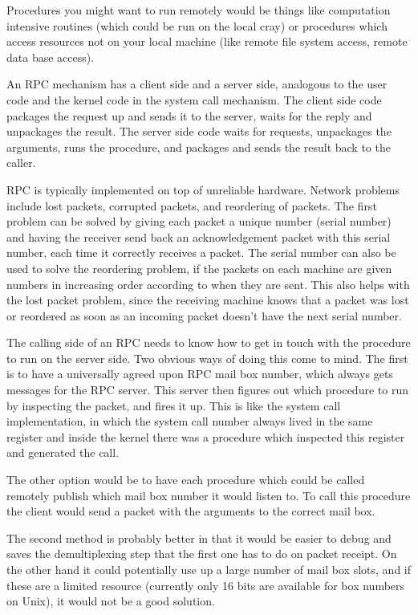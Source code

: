 Procedures you might want to run remotely would be things like computation
intensive routines (which could be run on the local cray) or
procedures which access resources not on your local machine (like remote
file system access, remote data base access).

An RPC mechanism has a client side and a server side, analogous
to the user code and the kernel code in the system call mechanism.
The client side code packages the request up and sends it to the server,
waits for the reply and unpackages the result.  The server side
code waits for requests, unpackages the arguments, runs the procedure,
and packages and sends the result back to the caller.

RPC is typically implemented on top of unreliable hardware.  Network problems
include lost packets, corrupted packets, and reordering of packets.  The
first problem can be solved by giving each packet a unique number (serial
number) and having the receiver send back an acknowledgement packet with
this serial number, each time it correctly receives a packet.  The serial
number can also be used to solve the reordering problem, if the packets on
each machine are given numbers in increasing order according to when they are
sent.  This also helps with the lost packet problem, since the receiving
machine knows that a packet was lost or reordered as soon as an incoming packet
doesn't have the next serial number.

The calling side of an RPC needs to know how to get in touch with the
procedure to run on the server side.  Two obvious ways of doing this come
to mind.  The first is to have a universally agreed upon RPC mail box
number, which always gets messages for the RPC server.  This server then
figures out which procedure to run by inspecting the packet, and fires it
up.  This is like the system call implementation, in which the system call
number always lived in the same register and inside the kernel there was a
procedure which inspected this register and generated the call.

The other option would be to have each procedure which could be called
remotely publish which mail box number it would listen to.  To call this
procedure the client would send a packet with the arguments to the correct
mail box.

The second method is probably better in that it would be easier to debug and
saves the demultiplexing step that the first one has to do on packet receipt.
On the other hand it could potentially use up a large number of mail box slots,
and if these are a limited resource (currently only 16 bits are available for
box numbers on Unix), it would not be a good solution.

